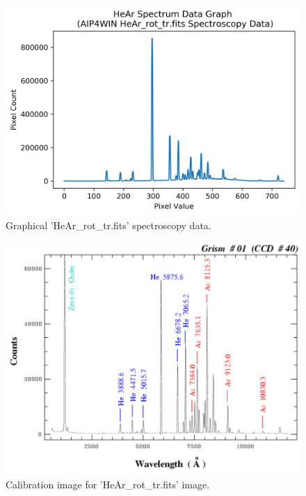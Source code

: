 \documentclass[12pt]{article}
\begin{document}
\begin{multicols}{2}
\begin{figure}[H]
  \centering
  \ContinuedFloat*
  \includegraphics[scale=0.6]{Images/AsImages/S4/HeAr/HeArPythonGraph.png}
  \caption{\label{HeAr Cali Python Graph} Graphical 'HeAr\_rot\_tr.fits' spectroscopy data.}
\end{figure}
\begin{figure}[H]
  \centering
  \ContinuedFloat
  \includegraphics[scale=0.35]{Images/AsImages/S4/HeAr/He-Ar_Arc-Lamp_Spectrum.PNG}
  \caption{\label{HeAr Cali Graph} Calibration image for 'HeAr\_rot\_tr.fits' image.}
\end{figure}
\end{multicols}
\end{document}
